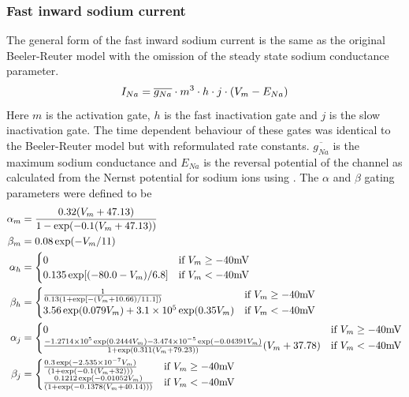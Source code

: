 \subsubsection{Fast inward sodium current}
The general form of the fast inward sodium current is the same as the original
Beeler-Reuter model with the omission of the steady state sodium conductance
parameter.
\begin{equation}
  I_{Na}=\overline{g_{Na}}\cdot m^3\cdot h\cdot j\cdot\left( V_m-E_{Na} \right)
\end{equation}
Here $m$ is the activation gate, $h$ is the fast inactivation gate and $j$ is the slow
inactivation gate. The time dependent behaviour of these gates was identical to the
Beeler-Reuter model  but with reformulated
rate constants. $\overline{g_{Na}}$ is
the maximum sodium conductance and $E_{Na}$ is the reversal potential of the
channel as calculated from the Nernst potential for sodium ions using
. The $\alpha$ and $\beta$ gating parameters were
defined to be
\begin{gather}
  \label{eqn:lr1_ina_coeffs}
  \begin{aligned}
    \alpha_m &= {0.32  (V_m+47.13) \over 1-\exp(-0.1(V_m+47.13))} \\
    \beta_m &= 0.08  \exp(-V_m / 11) \\
    \alpha_h &=
    \begin{cases}
      0 & \text{if $V_m \geq -40 \mathrm{mV}$} \\
      0.135  \exp[(-80.0-V_m) / 6.8] & \text{if $V_m < -40 \mathrm{mV}$}
    \end{cases} \\
    \beta_h &=
    \begin{cases}
      \frac{1}{0.13  (1 + \exp[- (V_m+10.66) / 11.1])} &
      \text{if $V_m \geq -40 \mathrm{mV}$} \\
      3.56  \exp(0.079 V_m) +  3.1 \times  10^{5}     \exp(0.35  V_m) & 
      \text{if $V_m < -40 \mathrm{mV}$}
    \end{cases} \\
    \alpha_j &= 
    \begin{cases}
      0 & \text{if $V_m \geq -40 \mathrm{mV}$} \\
      \frac{ -1.2714 \times  10^{5}    \exp(0.2444 V_m) -  3.474 \times  10^{-5}    
      \exp(-0.04391 V_m)}{1+\exp\left(0.311 (V_m+79.23) \right)} (V_m+37.78)&
      \text{if $V_m < -40 \mathrm{mV}$}
    \end{cases} \\
    \beta_j &=
    \begin{cases}
      0.3  \exp( -2.535 \times  10^{-7}     V_m) \over \left(1+\exp\left(-0.1 
          (V_m+32) \right) \right) & \text{if $V_m \geq -40 \mathrm{mV}$} \\
      0.1212  \exp( -0.01052  V_m) \over \left(1+\exp\left(-0.1378 
          (V_m+40.14) \right) \right)
      & \text{if $V_m < -40 \mathrm{mV}$}
    \end{cases}
  \end{aligned}
\end{gather}

